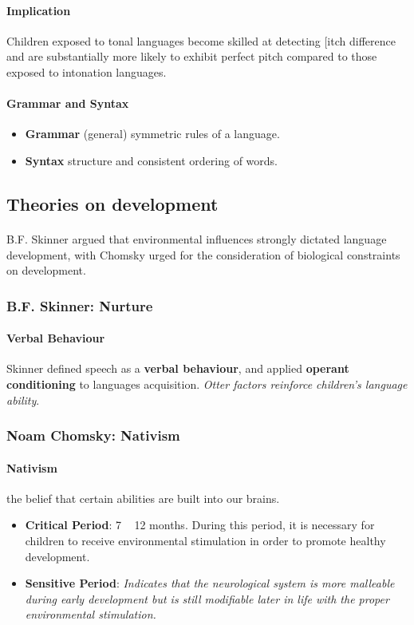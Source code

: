 \documentclass{article}
\begin{document}
	\paragraph{Implication} Children exposed to tonal languages become skilled at detecting [itch difference and are substantially more likely to exhibit perfect pitch compared to those exposed to intonation languages.
	\paragraph{Grammar and Syntax}
	\begin{itemize}
		\item \textbf{Grammar} (general) symmetric rules of a language.
		\item \textbf{Syntax} structure and consistent ordering of words.
	\end{itemize}

	\subsection{Theories on development}
	\paragraph{} B.F. Skinner argued that environmental influences strongly dictated language development, with Chomsky urged for the consideration of biological constraints on development.
	\subsubsection{B.F. Skinner: Nurture}
	\paragraph{Verbal Behaviour} Skinner defined speech as a \textbf{verbal behaviour}, and applied \textbf{operant conditioning} to languages acquisition. \emph{Otter factors reinforce children's language ability}.
	 
	\subsubsection{Noam Chomsky: Nativism}
	\paragraph{Nativism} the belief that certain abilities are built into our brains.
	\begin{itemize}
		\item \textbf{Critical Period}: 7 ~ 12 months. During this period, it is necessary for children to receive environmental stimulation in order to promote healthy development.
		\item \textbf{Sensitive Period}: \emph{Indicates that the neurological system is more malleable during early development but is still modifiable later in life with the proper environmental stimulation.}
	\end{itemize}
	
\end{document}
